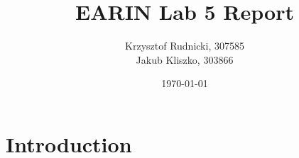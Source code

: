 \documentclass{article}[12pt]
\title{EARIN Lab 5 Report}
\author{Krzysztof Rudnicki, 307585 \\ Jakub Kliszko, 303866  }
\date{\today}
\begin{document}
\maketitle

\section{Introduction}
\end{document}
